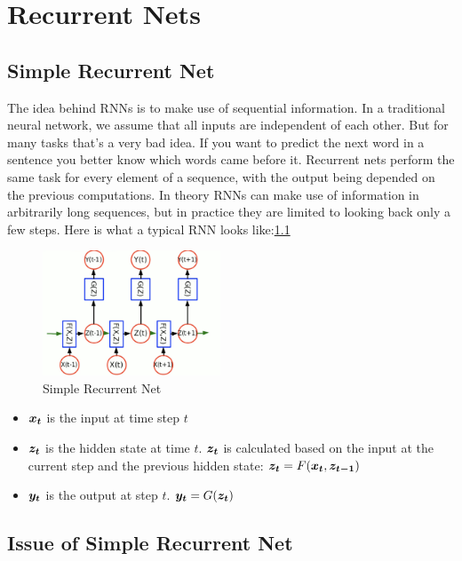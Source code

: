 \chapter{Recurrent Nets}

\section{Simple Recurrent Net}

The idea behind RNNs is to make use of sequential information. 
In a traditional neural network, we assume that all inputs are independent of each other.
But for many tasks that’s a very bad idea. 
If you want to predict the next word in a sentence you better know which words came before it. 
Recurrent nets perform the same task for every element of a sequence, with the output being depended on the previous computations. 
In theory RNNs can make use of information in arbitrarily long sequences, but in practice they are limited to looking back only a few steps. 
Here is what a typical RNN looks like:\cref{fig:Simple RNN}

\begin{figure}[h]
    \centering
    \includegraphics[width=150pt]{lectures/06-b-rnn/image/rnn.png}
    \caption{Simple Recurrent Net}
    \label{fig:Simple RNN}
\end{figure}

\begin{itemize}
  \item $\vect{x_{t}}$ is the input at time step $t$
  \item $\vect{z_{t}}$ is the hidden state at time $t$. $\vect{z_{t}}$ is calculated based on the input at the current step and the previous hidden state:
  $\vect{z_t} = F(\vect{x_t}, \vect{z_{t-1}})$
  \item $\vect{y_t}$ is the output at step $t$. $\vect{y_t} = G(\vect{z_t})$
\end{itemize}



\section{Issue of Simple Recurrent Net}
